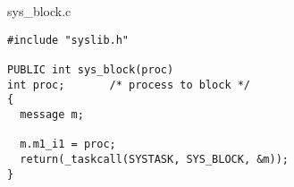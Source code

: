 sys\_block.c

\begin{verbatim}
#include "syslib.h"

PUBLIC int sys_block(proc)
int proc;		/* process to block */
{
  message m;

  m.m1_i1 = proc;
  return(_taskcall(SYSTASK, SYS_BLOCK, &m));
}
\end{verbatim}
